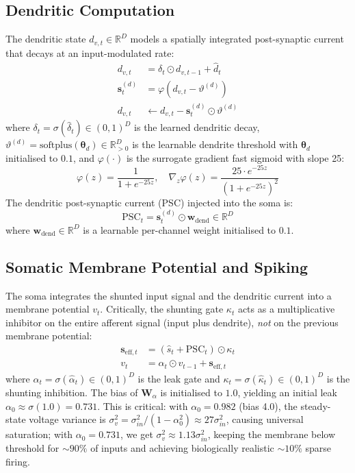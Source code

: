\documentclass[11pt]{article}
\begin{document}
\subsection{Dendritic Computation}

The dendritic state $d_{v,t} \in \mathbb{R}^D$ models a spatially integrated post-synaptic current that decays at an input-modulated rate:
\begin{align}
    d_{v,t} &= \delta_t \odot d_{v,t-1} + \hat{d}_t \label{eq:dendrite_state} \\
    \mathbf{s}^{(d)}_t &= \varphi\!\left(d_{v,t} - \vartheta^{(d)}\right) \label{eq:dend_spike} \\
    d_{v,t} &\leftarrow d_{v,t} - \mathbf{s}^{(d)}_t \odot \vartheta^{(d)} \label{eq:dend_reset}
\end{align}
where $\delta_t = \sigma(\hat{\delta}_t) \in (0,1)^D$ is the learned dendritic decay, $\vartheta^{(d)} = \mathrm{softplus}(\boldsymbol{\theta}_d) \in \mathbb{R}^D_{>0}$ is the learnable dendrite threshold with $\boldsymbol{\theta}_d$ initialised to $0.1$, and $\varphi(\cdot)$ is the surrogate gradient fast sigmoid with slope 25:
\begin{equation}
    \varphi(z) = \frac{1}{1 + e^{-25z}}, \quad \nabla_z \varphi(z) = \frac{25 \cdot e^{-25z}}{(1+e^{-25z})^2}
\end{equation}
The dendritic post-synaptic current (PSC) injected into the soma is:
\begin{equation}
    \mathrm{PSC}_t = \mathbf{s}^{(d)}_t \odot \mathbf{w}_{\mathrm{dend}} \in \mathbb{R}^D
\end{equation}
where $\mathbf{w}_{\mathrm{dend}} \in \mathbb{R}^D$ is a learnable per-channel weight initialised to $0.1$.

\subsection{Somatic Membrane Potential and Spiking}

The soma integrates the shunted input signal and the dendritic current into a membrane potential $v_t$. Critically, the shunting gate $\kappa_t$ acts as a multiplicative inhibitor on the entire afferent signal (input plus dendrite), \emph{not} on the previous membrane potential:
\begin{align}
    \mathbf{s}_{\mathrm{eff},t} &= \left( \hat{s}_t + \mathrm{PSC}_t \right) \odot \kappa_t \\
    v_t &= \alpha_t \odot v_{t-1} + \mathbf{s}_{\mathrm{eff},t} \label{eq:soma}
\end{align}
where $\alpha_t = \sigma(\hat{\alpha}_t) \in (0,1)^D$ is the leak gate and $\kappa_t = \sigma(\hat{\kappa}_t) \in (0,1)^D$ is the shunting inhibition. The bias of $\mathbf{W}_\alpha$ is initialised to $1.0$, yielding an initial leak $\alpha_0 \approx \sigma(1.0) = 0.731$. This is critical: with $\alpha_0 = 0.982$ (bias 4.0), the steady-state voltage variance is $\sigma^2_v = \sigma^2_{in} / (1 - \alpha_0^2) \approx 27 \sigma^2_{in}$, causing universal saturation; with $\alpha_0 = 0.731$, we get $\sigma^2_v \approx 1.13 \sigma^2_{in}$, keeping the membrane below threshold for $\sim 90\%$ of inputs and achieving biologically realistic $\sim 10\%$ sparse firing.
\end{document}
